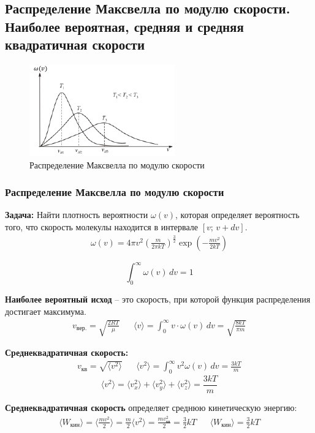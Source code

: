 \subsection{\textbf{Распределение Максвелла по модулю скорости.} Наиболее вероятная, средняя и средняя квадратичная скорости}
\begin{figure}
	\centering
	\includegraphics[width=0.5\linewidth]{image/Максвел}
	\caption{Распределение Максвелла по модулю скорости}
	\label{fig:11}
\end{figure}

\subsubsection*{Распределение Максвелла по модулю скорости}
\textbf{Задача: }Найти плотность вероятности $\omega(v)$, которая определяет вероятность того, что скорость молекулы находится в интервале $[v; \, v + dv]$.
\begin{align} \label{17.1}
	\boxed{\omega(v) = 4 \pi v^2 \left(\frac{m}{2\pi k T}\right)^{\frac{3}{2}} \exp \left(-\frac{mv^2}{2kT}\right)}
\end{align}

\[\int_{0}^{\infty} \omega(v) \, dv = 1\]

\textbf{Наиболее вероятный исход }-- это скорость, при которой функция распределения достигает максимума.
\begin{align*}
	v_\text{вер.} = \sqrt{\frac{2RT}{\mu}} && \langle v \rangle = \int_{0}^{\infty} v \cdot \omega(v) \, dv = \sqrt{\frac{8kT}{\pi m}}
\end{align*}

\textbf{Среднеквадратичная скорость:}
\begin{align*}
	v_\text{кв} = \sqrt{\langle v^2 \rangle} && \langle v^2 \rangle = \int_{0}^{\infty} v^2 \omega(v) \, dv = \frac{3kT}{m}
\end{align*}
\[\langle v^2 \rangle = \langle v^2_x \rangle + \langle v^2_y \rangle + \langle v^2_z \rangle = \frac{3kT}{m}\]

\textbf{Среднеквадратичная скорость} определяет среднюю кинетическую энергию:
\begin{align*}
	\langle W_\text{кин} \rangle = \langle \frac{mv^2}{2} \rangle = \frac{m}{2} \langle v^2 \rangle = \frac{mv^2_\text{кв}}{2} = \frac{3}{2}kT && \boxed{\langle W_\text{кин} \rangle = \frac{3}{2}kT}
\end{align*}